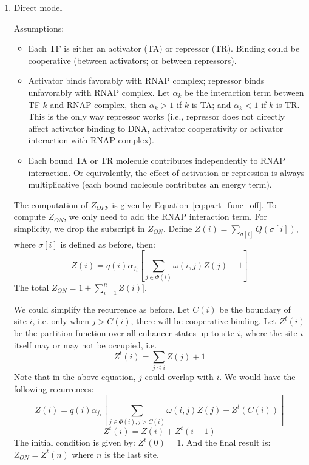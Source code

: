 \documentclass[11pt]{article}
\begin{document}
\begin{enumerate}
\begin{enumerate}
\item{Direct model}

Assumptions: 
\begin{itemize}
\item Each TF is either an activator (TA) or repressor (TR). Binding could be cooperative (between activators; or between repressors). 
\item Activator binds favorably with RNAP complex; repressor binds unfavorably with RNAP complex. Let $\alpha_k$ be the interaction term between TF $k$ and RNAP complex, then $\alpha_k > 1$ if $k$ is TA; and $\alpha_k < 1$ if $k$ is TR. This is the only way repressor works (i.e., repressor does not directly affect activator binding to DNA, activator cooperativity or activator interaction with RNAP complex). 
\item Each bound TA or TR molecule contributes independently to RNAP interaction. Or equivalently, the effect of activation or repression is always multiplicative (each bound molecule contributes an energy term). 
\end{itemize}

The computation of $Z_{OFF}$ is given by Equation~\ref{eq:part_func_off}. To compute $Z_{ON}$, we only need to add the RNAP interaction term. For simplicity, we drop the subscript in $Z_{ON}$. Define $Z(i) = \sum_{\sigma[i]}Q(\sigma[i])$, where $\sigma[i]$ is defined as before, then:
\begin{equation}
Z(i) = q(i) \alpha_{f_i} \left[ \sum_{j \in \Phi (i)}\omega(i,j) Z(j) + 1\right]
\label{eq:expression_simple}
\end{equation}
The total $Z_{ON} = 1 + \sum_{i=1}^{n}Z(i)]$. %

We could simplify the recurrence as before. Let $C(i)$ be the boundary of site $i$, i.e. only when $j > C(i)$, there will be cooperative binding. Let $Z^t(i)$ be the partition function over all enhancer states up to site $i$, where the site $i$ itself may or may not be occupied, i.e.
\begin{equation}
Z^t(i) = \sum_{j \leq i} Z(j) + 1
\end{equation}
Note that in the above equation, $j$ could overlap with $i$. We would have the following recurrences: 
\begin{equation}
Z(i) = q(i) \alpha_{f_i} \left[ \sum_{j \in \Phi (i), j > C(i)} \omega(i,j) Z(j) + Z^t(C(i)) \right]
\end{equation}
\begin{equation}
Z^t(i) = Z(i) + Z^t(i-1)
\end{equation}
The initial condition is given by: $Z^t(0) = 1$. And the final result is: $Z_{ON} = Z^t(n)$ where $n$ is the last site. 


\end{enumerate}
\end{enumerate}
\end{document}
